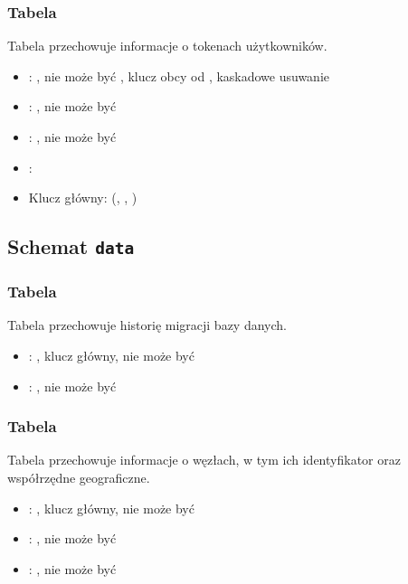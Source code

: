 \subsubsection{Tabela }
Tabela przechowuje informacje o tokenach użytkowników.
\begin{itemize}
    \item {}: , nie może być , klucz obcy od , kaskadowe usuwanie
    \item {}: , nie może być 
    \item {}: , nie może być 
    \item {}: 
    \item Klucz główny: (, , )
\end{itemize}

\subsection{Schemat \texttt{data}}

\subsubsection{Tabela }
Tabela przechowuje historię migracji bazy danych.
\begin{itemize}
    \item {}: , klucz główny, nie może być 
    \item {}: , nie może być 
\end{itemize}

\subsubsection{Tabela }
Tabela przechowuje informacje o węzłach, w tym ich identyfikator oraz współrzędne geograficzne.
\begin{itemize}
    \item {}: , klucz główny, nie może być 
    \item {}: , nie może być 
    \item {}: , nie może być 
\end{itemize}

